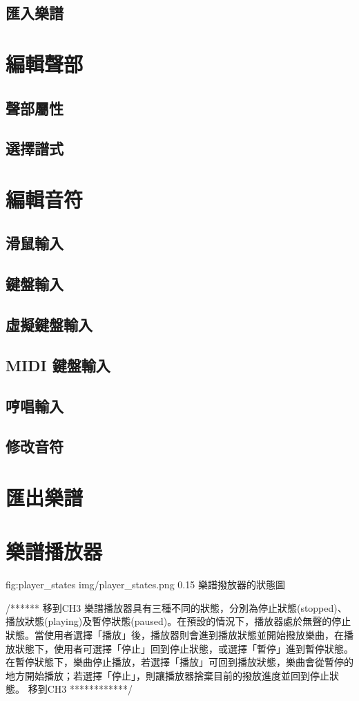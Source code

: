 \documentclass[12pt,a4paper,oneside]{report}
\begin{document}
   \subsection{匯入樂譜}
\section{編輯聲部}
   \subsection{聲部屬性}
   \subsection{選擇譜式}
\section{編輯音符}
   \subsection{滑鼠輸入}
   \subsection{鍵盤輸入}
   \subsection{虛擬鍵盤輸入}
   \subsection{MIDI 鍵盤輸入}
   \subsection{哼唱輸入}
   \subsection{修改音符}
\section{匯出樂譜}
\section{樂譜播放器}

\figurewithcaption
{fig:player_states}
{img/player_states.png}
{0.15}
{樂譜撥放器的狀態圖}

/****** 移到CH3  
樂譜播放器具有三種不同的狀態，分別為停止狀態(stopped)、播放狀態(playing)及暫停狀態(paused)。在預設的情況下，播放器處於無聲的停止狀態。當使用者選擇「播放」後，播放器則會進到播放狀態並開始撥放樂曲，在播放狀態下，使用者可選擇「停止」回到停止狀態，或選擇「暫停」進到暫停狀態。在暫停狀態下，樂曲停止播放，若選擇「播放」可回到播放狀態，樂曲會從暫停的地方開始播放；若選擇「停止」，則讓播放器捨棄目前的撥放進度並回到停止狀態。
 移到CH3  ************/  
\end{document}
